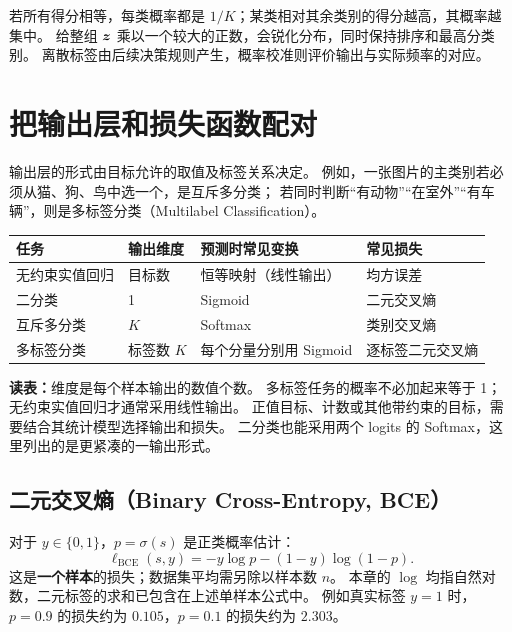 \begin{keyidea}[得分间距决定概率集中程度]
若所有得分相等，每类概率都是 $1/K$；某类相对其余类别的得分越高，其概率越集中。
给整组 $\boldsymbol{z}$ 乘以一个较大的正数，会锐化分布，同时保持排序和最高分类别。
离散标签由后续决策规则产生，概率校准则评价输出与实际频率的对应。
\end{keyidea}


\section{把输出层和损失函数配对}
\label{sec:nn-output}

输出层的形式由目标允许的取值及标签关系决定。
例如，一张图片的主类别若必须从猫、狗、鸟中选一个，是互斥多分类；
若同时判断“有动物”“在室外”“有车辆”，则是多标签分类（Multilabel Classification）。

\begin{center}
\small
\renewcommand{\arraystretch}{1.35}
\begin{tabularx}{\textwidth}{P{30mm}P{22mm}Y P{29mm}}
\toprule
任务 & 输出维度 & 预测时常见变换 & 常见损失\\
\midrule
无约束实值回归 & 目标数 & 恒等映射（线性输出） & 均方误差\\
二分类 & 1 & Sigmoid & 二元交叉熵\\
互斥多分类 & $K$ & Softmax & 类别交叉熵\\
多标签分类 & 标签数 $K$ & 每个分量分别用 Sigmoid & 逐标签二元交叉熵\\
\bottomrule
\end{tabularx}
\end{center}

\textbf{读表：}维度是每个样本输出的数值个数。
多标签任务的概率不必加起来等于 1；无约束实值回归才通常采用线性输出。
正值目标、计数或其他带约束的目标，需要结合其统计模型选择输出和损失。
二分类也能采用两个 logits 的 Softmax，这里列出的是更紧凑的一输出形式。

\subsection{二元交叉熵（Binary Cross-Entropy, BCE）}
对于 $y\in\{0,1\}$，$p=\sigma(s)$ 是正类概率估计：
\begin{equation}
 \ell_{\mathrm{BCE}}(s,y)=-y\log p-(1-y)\log(1-p).
 \label{eq:bce}
\end{equation}
这是\textbf{一个样本}的损失；数据集平均需另除以样本数 $n$。
本章的 $\log$ 均指自然对数，二元标签的求和已包含在上述单样本公式中。
例如真实标签 $y=1$ 时，$p=0.9$ 的损失约为 $0.105$，$p=0.1$ 的损失约为 $2.303$。

